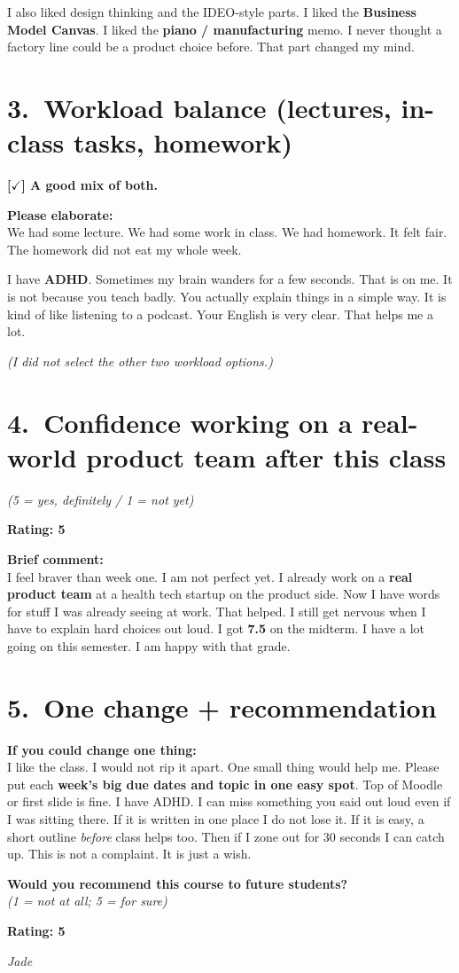 \documentclass[11pt,a4paper]{article}
\begin{document}
I also liked design thinking and the IDEO-style parts. I liked the \textbf{Business Model Canvas}. I liked the \textbf{piano / manufacturing} memo. I never thought a factory line could be a product choice before. That part changed my mind.

\section*{3.\ Workload balance (lectures, in-class tasks, homework)}

\textbf{[$\checkmark$] A good mix of both.}

\medskip
\noindent\textbf{Please elaborate:}\\
We had some lecture. We had some work in class. We had homework. It felt fair. The homework did not eat my whole week.

I have \textbf{ADHD}. Sometimes my brain wanders for a few seconds. That is on me. It is not because you teach badly. You actually explain things in a simple way. It is kind of like listening to a podcast. Your English is very clear. That helps me a lot.

\medskip
\noindent\textit{(I did not select the other two workload options.)}

\section*{4.\ Confidence working on a real-world product team after this class}

\textit{(5 = yes, definitely / 1 = not yet)}

\medskip
\noindent\textbf{Rating: 5}

\medskip
\noindent\textbf{Brief comment:}\\
I feel braver than week one. I am not perfect yet. I already work on a \textbf{real product team} at a health tech startup on the product side. Now I have words for stuff I was already seeing at work. That helped. I still get nervous when I have to explain hard choices out loud. I got \textbf{7.5} on the midterm. I have a lot going on this semester. I am happy with that grade.

\section*{5.\ One change + recommendation}

\noindent\textbf{If you could change one thing:}\\
I like the class. I would not rip it apart. One small thing would help me. Please put each \textbf{week's big due dates and topic in one easy spot}. Top of Moodle or first slide is fine. I have ADHD. I can miss something you said out loud even if I was sitting there. If it is written in one place I do not lose it. If it is easy, a short outline \textit{before} class helps too. Then if I zone out for 30 seconds I can catch up. This is not a complaint. It is just a wish.

\medskip
\noindent\textbf{Would you recommend this course to future students?}\\
\textit{(1 = not at all; 5 = for sure)}

\medskip
\noindent\textbf{Rating: 5}

\vspace{1em}
\noindent\textit{Jade}
\end{document}
